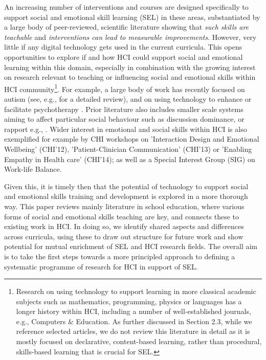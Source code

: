 \documentclass[prodmode,acmtochi]{acmsmall}
\begin{document}
An increasing number of interventions and courses are designed specifically to support social and emotional skill learning (SEL) in these areas, substantiated by a large body of peer-reviewed, scientific literature showing that \emph{such skills are teachable} and \emph{interventions can lead to measurable improvements}. 
%
However, very little if any digital technology gets used in the current curricula. This opens opportunities to explore if and how HCI could support social and emotional learning within this domain, especially in combination with the growing interest on research relevant to teaching or influencing social and emotional skills within HCI community\footnote{Research on using technology to support learning in more classical academic subjects such as mathematics, programming, physics or languages  has a longer history within HCI, including a number of well-established journals, e.g., Computers \& Education. As further discussed in Section 2.3, while we reference selected articles, we do not review this literature in detail as it is mostly focused on declarative, content-based learning, rather than procedural, skills-based learning that is crucial for SEL.}. 
For example, a large body of work has recently focused on autism (see, e.g.,  \cite{Kientz2013} for a detailed review), and on using technology to enhance or facilitate psychotherapy \cite{Coyle2011,Matthews2011,DeSa2010,Hancock2010}. Prior literature also includes smaller scale systems aiming to  affect particular social behaviour such as discussion dominance, or rapport e.g., \cite{Narumi2009,Piper2006,Balaam2011,Kim2008,McAtamney2006,Schroyen2008,Kim2008a,Toups2007,Kreitmayer2012,Daily2010,Munson2010}. 
%
%
Wider interest in emotional and social skills within HCI is also exemplified for example by CHI workshops on 'Interaction Design and Emotional Wellbeing' (CHI'12), 'Patient-Clinician Communication' (CHI'13) or 'Enabling Empathy in Health care' (CHI'14); as well as a Special Interest Group (SIG) on Work-life Balance. 

Given this, it is timely then that the potential of technology to support social and emotional skills training and development is explored in a more thorough way.
This paper reviews mainly literature in school education, where various forms of social and emotional skills teaching are key, and connects these to existing work in HCI. 
%
In doing so, we identify shared aspects and differences across curricula, using these to draw out structure for future work and show potential for mutual enrichment of SEL and HCI research fields. 
%
The overall aim is to take the first steps towards a more principled approach
to defining a systematic programme of research for HCI in support of SEL. 
\end{document}
